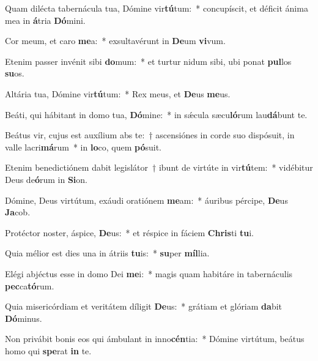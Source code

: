 \item Quam dilécta tabernácula tua, Dómine vir\textbf{tú}tum:~* concupíscit, et déficit ánima mea in \textbf{á}tria \textbf{Dó}mini.
\item Cor meum, et caro \textbf{me}a:~* exsultavérunt in \textbf{De}um \textbf{vi}vum.
\item Etenim passer invénit sibi \textbf{do}mum:~* et turtur nidum sibi, ubi ponat \textbf{pul}los \textbf{su}os.
\item Altária tua, Dómine vir\textbf{tú}tum:~* Rex meus, et \textbf{De}us \textbf{me}us.
\item Beáti, qui hábitant in domo tua, \textbf{Dó}mine:~* in sǽcula sæcu\textbf{ló}rum lau\textbf{dá}bunt te.
\item Beátus vir, cujus est auxílium abs te:~† ascensiónes in corde suo dispósuit, in valle lacri\textbf{má}rum~* in \textbf{lo}co, quem \textbf{pó}suit.
\item Etenim benedictiónem dabit legislátor~† ibunt de virtúte in vir\textbf{tú}tem:~* vidébitur Deus de\textbf{ó}rum in \textbf{Si}on.
\item Dómine, Deus virtútum, exáudi oratiónem \textbf{me}am:~* áuribus pércipe, \textbf{De}us \textbf{Ja}cob.
\item Protéctor noster, áspice, \textbf{De}us:~* et réspice in fáciem \textbf{Chris}ti \textbf{tu}i.
\item Quia mélior est dies una in átriis \textbf{tu}is:~* \textbf{su}per \textbf{míl}lia.
\item Elégi abjéctus esse in domo Dei \textbf{me}i:~* magis quam habitáre in tabernáculis \textbf{pec}ca\textbf{tó}rum.
\item Quia misericórdiam et veritátem díligit \textbf{De}us:~* grátiam et glóriam \textbf{da}bit \textbf{Dó}minus.
\item Non privábit bonis eos qui ámbulant in inno\textbf{cén}tia:~* Dómine virtútum, beátus homo qui \textbf{spe}rat \textbf{in} te.
